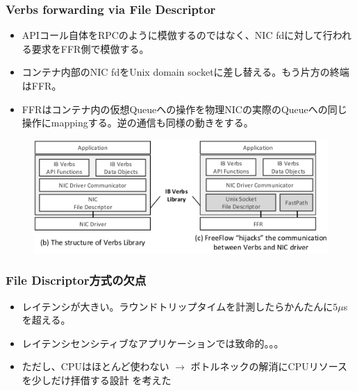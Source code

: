 \documentclass[dvipdfmx,9pt,notheorems]{beamer}
\theoremstyle{definition}
\begin{document}
\begin{frame}\frametitle{Verbs forwarding via File Descriptor}
	\begin{itemize}
		\item APIコール自体をRPCのように模倣するのではなく、NIC fdに対して行われる要求をFFR側で模倣する。
		\item コンテナ内部のNIC fdをUnix domain socketに差し替える。もう片方の終端はFFR。
		\item FFRはコンテナ内の仮想Queueへの操作を物理NICの実際のQueueへの同じ操作にmappingする。逆の通信も同様の動きをする。
	\end{itemize}
  \begin{figure}[htb]
    \centering
    \includegraphics[scale=1]{fig/figure7-bc.png}
  \end{figure}
\end{frame}

\begin{frame}\frametitle{File Discriptor方式の欠点}
	\begin{itemize}
		\item レイテンシが大きい。ラウンドトリップタイムを計測したらかんたんに$5\mu$sを超える。
		\item レイテンシセンシティブなアプリケーションでは致命的。。。
		\item ただし、CPUはほとんど使わない $\rightarrow$ ボトルネックの解消にCPUリソースを少しだけ拝借する設計  を考えた
	\end{itemize}
\end{frame}
\end{document}
